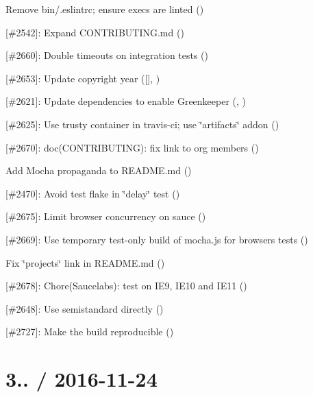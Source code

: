 \begin{DoxyItemize}
\item Remove bin/.eslintrc; ensure execs are linted (\href{https://github.com/boneskull}{\tt })
\item \mbox{[}\#2542\mbox{]}\+: Expand C\+O\+N\+T\+R\+I\+B\+U\+T\+I\+N\+G.\+md (\href{https://github.com/boneskull}{\tt })
\item \mbox{[}\#2660\mbox{]}\+: Double timeouts on integration tests (\href{https://github.com/munter}{\tt })
\item \mbox{[}\#2653\mbox{]}\+: Update copyright year (\mbox{[}\mbox{]}, \href{https://github.com/munter}{\tt })
\item \mbox{[}\#2621\mbox{]}\+: Update dependencies to enable Greenkeeper (\href{https://github.com/boneskull}{\tt }, \href{https://github.com/greenkeeper}{\tt })
\item \mbox{[}\#2625\mbox{]}\+: Use trusty container in travis-\/ci; use \char`\"{}artifacts\char`\"{} addon (\href{https://github.com/boneskull}{\tt })
\item \mbox{[}\#2670\mbox{]}\+: doc(\+C\+O\+N\+T\+R\+I\+B\+U\+T\+I\+N\+G)\+: fix link to org members (\href{https://github.com/coderbyheart}{\tt })
\item Add Mocha propaganda to R\+E\+A\+D\+M\+E.\+md (\href{https://github.com/boneskull}{\tt })
\item \mbox{[}\#2470\mbox{]}\+: Avoid test flake in \char`\"{}delay\char`\"{} test (\href{https://github.com/boneskull}{\tt })
\item \mbox{[}\#2675\mbox{]}\+: Limit browser concurrency on sauce (\href{https://github.com/boneskull}{\tt })
\item \mbox{[}\#2669\mbox{]}\+: Use temporary test-\/only build of mocha.\+js for browsers tests (\href{https://github.com/munter}{\tt })
\item Fix \char`\"{}projects\char`\"{} link in R\+E\+A\+D\+M\+E.\+md (\href{https://github.com/boneskull}{\tt })
\item \mbox{[}\#2678\mbox{]}\+: Chore(\+Saucelabs)\+: test on I\+E9, I\+E10 and I\+E11 (\href{https://github.com/coderbyheart}{\tt })
\item \mbox{[}\#2648\mbox{]}\+: Use {\ttfamily semistandard} directly (\href{https://github.com/kt3k}{\tt })
\item \mbox{[}\#2727\mbox{]}\+: Make the build reproducible (\href{https://github.com/lamby}{\tt })
\end{DoxyItemize}

\section*{3.. / 2016-\/11-\/24}

